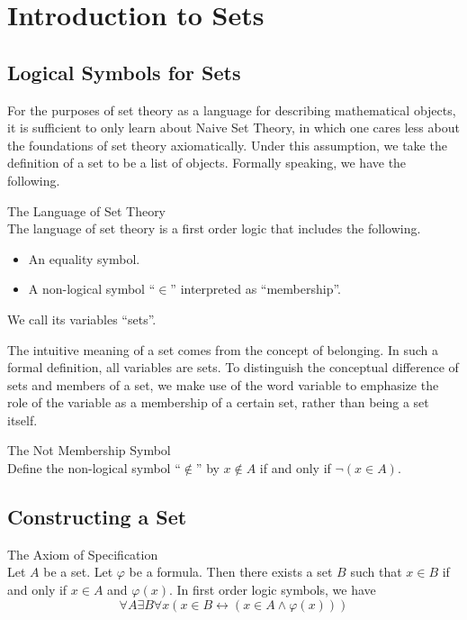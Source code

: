 \documentclass[a4paper]{article}
\begin{document}
\pagebreak
\section{Introduction to Sets}
\subsection{Logical Symbols for Sets}
For the purposes of set theory as a language for describing mathematical objects, it is sufficient to only learn about Naive Set Theory, in which one cares less about the foundations of set theory axiomatically. Under this assumption, we take the definition of a set to be a list of objects. Formally speaking, we have the following. 

\begin{defn}{The Language of Set Theory}{}\\
The language of set theory is a first order logic that includes the following. 
\begin{itemize}
\item An equality symbol. 
\item A non-logical symbol ``$\in$'' interpreted as ``membership''. 
\end{itemize}
We call its variables ``sets''. 
\end{defn}

The intuitive meaning of a set comes from the concept of belonging. In such a formal definition, all variables are sets. To distinguish the conceptual difference of sets and members of a set, we make use of the word variable to emphasize the role of the variable as a membership of a certain set, rather than being a set itself. 

\begin{defn}{The Not Membership Symbol}{}\\
Define the non-logical symbol ``$\notin$'' by $x\notin A$ if and only if $\neg (x\in A)$. 
\end{defn}

\subsection{Constructing a Set}
\begin{axm}{The Axiom of Specification}{}\\
Let $A$ be a set. Let $\varphi$ be a formula. Then there exists a set $B$ such that $x\in B$ if and only if $x\in A$ and $\varphi(x)$. In first order logic symbols, we have $$\forall A\exists B\forall x(x\in B\leftrightarrow(x\in A\wedge\varphi(x)))$$
\end{axm}
\end{document}
